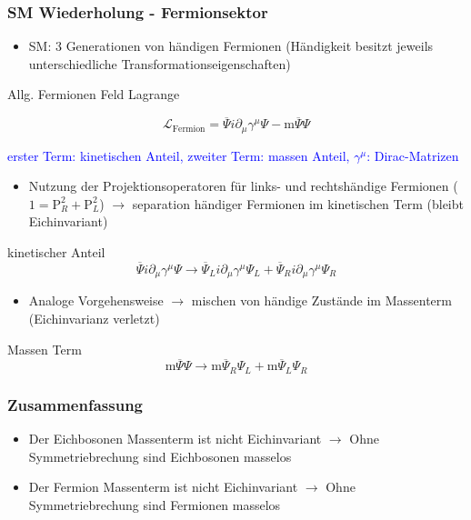 \documentclass[xcolor=dvipsnames]{beamer}
\begin{document}
\begin{frame}
\frametitle{SM Wiederholung - Fermionsektor}
\begin{itemize}
\item SM: 3 Generationen von händigen Fermionen (Händigkeit besitzt jeweils unterschiedliche Transformationseigenschaften)
\end{itemize}
\begin{block}{Allg. Fermionen Feld Lagrange}

\begin{equation*}
\mathscr{L}_{\text{Fermion}}=\overline{\Psi} i \partial_{\mu} \gamma^{\mu} \Psi -\text{m}\overline{\Psi} \Psi 
\end{equation*}
\end{block}
\textcolor{Blue}{erster Term: kinetischen Anteil, zweiter Term: massen Anteil,  $\gamma^{\mu}$: Dirac-Matrizen \autocite{4}}
\end{frame}
\begin{frame}
\begin{itemize}
\item Nutzung der Projektionsoperatoren für links- und rechtshändige Fermionen ($1=\text{P}_{R}^{2}+ \text{P}_{L}^{2}$) $\rightarrow $ separation händiger Fermionen im kinetischen Term (bleibt Eichinvariant)

\end{itemize}
\begin{block}{kinetischer Anteil}
\begin{equation*}
\overline{\Psi} i \partial_{\mu} \gamma^{\mu} \Psi  \rightarrow \overline{\Psi}_{L} i \partial_{\mu} \gamma^{\mu} \Psi_{L} +\overline{\Psi}_{R} i \partial_{\mu} \gamma^{\mu} \Psi_{R} 
\end{equation*}
\end{block}

\begin{itemize}
\item Analoge Vorgehensweise $\rightarrow$ mischen von  händige Zustände im Massenterm  (Eichinvarianz verletzt)
\end{itemize}

\begin{block}{Massen Term}
\begin{equation*}
\text{m}\overline{\Psi} \Psi  \rightarrow \text{m}\overline{\Psi}_{R} \Psi_{L} +\text{m}\overline{\Psi}_{L} \Psi_{R} 
\end{equation*}
\end{block}
\end{frame}
\begin{frame}
\frametitle{Zusammenfassung}
\begin{itemize}
\item Der Eichbosonen Massenterm ist nicht Eichinvariant   $\rightarrow$ Ohne Symmetriebrechung sind Eichbosonen masselos
\item Der Fermion Massenterm ist nicht Eichinvariant  $\rightarrow$ Ohne Symmetriebrechung sind Fermionen masselos
\end{itemize}
\end{frame}
\end{document}

